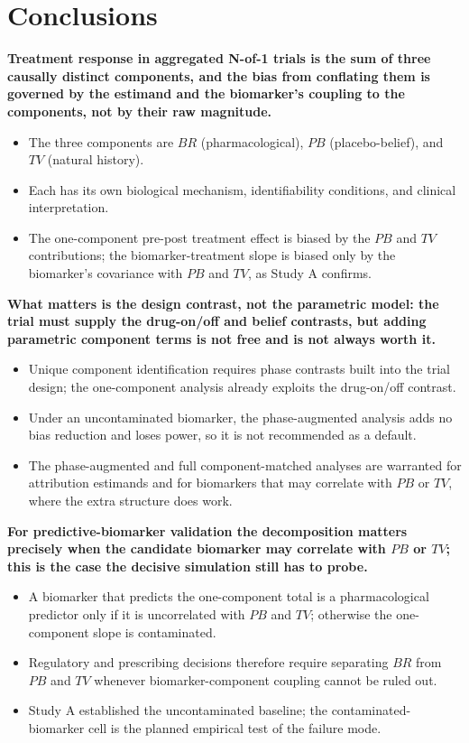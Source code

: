 \documentclass[
  11pt,
]{article}
\begin{document}
\section{Conclusions}\label{conclusions}

\textbf{Treatment response in aggregated N-of-1 trials is the sum of three causally distinct components, and the bias from conflating them is governed by the estimand and the biomarker's coupling to the components, not by their raw magnitude.}

\begin{itemize}\setlength{\itemsep}{2pt}\setlength{\parskip}{0pt}
\item The three components are $BR$ (pharmacological), $PB$ (placebo-belief), and $TV$ (natural history).
\item Each has its own biological mechanism, identifiability conditions, and clinical interpretation.
\item The one-component pre-post treatment effect is biased by the $PB$ and $TV$ contributions; the biomarker-treatment slope is biased only by the biomarker's covariance with $PB$ and $TV$, as Study A confirms.
\end{itemize}

\textbf{What matters is the design contrast, not the parametric model: the trial must supply the drug-on/off and belief contrasts, but adding parametric component terms is not free and is not always worth it.}

\begin{itemize}\setlength{\itemsep}{2pt}\setlength{\parskip}{0pt}
\item Unique component identification requires phase contrasts built into the trial design; the one-component analysis already exploits the drug-on/off contrast.
\item Under an uncontaminated biomarker, the phase-augmented analysis adds no bias reduction and loses power, so it is not recommended as a default.
\item The phase-augmented and full component-matched analyses are warranted for attribution estimands and for biomarkers that may correlate with $PB$ or $TV$, where the extra structure does work.
\end{itemize}

\textbf{For predictive-biomarker validation the decomposition matters precisely when the candidate biomarker may correlate with $PB$ or $TV$; this is the case the decisive simulation still has to probe.}

\begin{itemize}\setlength{\itemsep}{2pt}\setlength{\parskip}{0pt}
\item A biomarker that predicts the one-component total is a pharmacological predictor only if it is uncorrelated with $PB$ and $TV$; otherwise the one-component slope is contaminated.
\item Regulatory and prescribing decisions therefore require separating $BR$ from $PB$ and $TV$ whenever biomarker-component coupling cannot be ruled out.
\item Study A established the uncontaminated baseline; the contaminated-biomarker cell is the planned empirical test of the failure mode.
\end{itemize}
\end{document}
